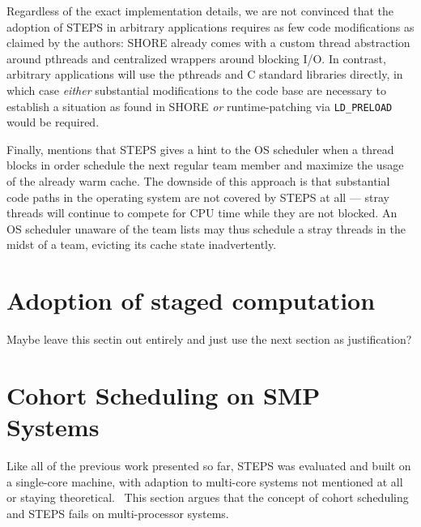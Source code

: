 \documentclass[12pt,a4paper]{book}
\begin{document}
Regardless of the exact implementation details, we are not convinced that the adoption of STEPS in arbitrary applications requires as few code modifications as claimed by the authors:
SHORE already comes with a custom thread abstraction around pthreads and centralized wrappers around blocking I/O.
In contrast, arbitrary applications will use the pthreads and C standard libraries directly, in which case
\emph{either} substantial modifications to the code base are necessary to establish a situation as found in SHORE
\emph{or} runtime-patching via \texttt{LD\_PRELOAD} would be required.

Finally, \cite{steps} mentions that STEPS gives a hint to the OS scheduler when a thread blocks in order schedule the next regular team member and maximize the usage of the already warm cache.
The downside of this approach is that substantial  code paths in the operating system are not covered by STEPS at all
--- stray threads will continue to compete for CPU time while they are not blocked.
An OS scheduler unaware of the team lists may thus schedule a stray threads in the midst of a team, evicting its cache state inadvertently.

\section{Adoption of staged computation}
Maybe leave this sectin out entirely and just use the next section as justification?

\section{Cohort Scheduling on SMP Systems}
Like all of the previous work presented so far, STEPS was evaluated and built on a single-core machine, with adaption to multi-core systems not mentioned at all or staying theoretical.~\cite{steps,harizopoulos2003case}
This section argues that the concept of cohort scheduling and STEPS fails on multi-processor systems.
\end{document}
